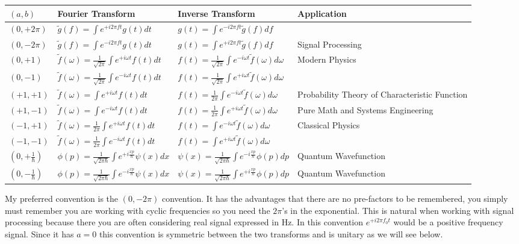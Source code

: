 \documentclass[12pt]{article}
\begin{document}
\begin{center}
\begin{tabularx}{\textwidth}{|m{1.5cm}|m{5cm}|m{5 cm}|X|}
\hline
$(a,b)$ & Fourier Transform & Inverse Transform & Application\\ \hline
$(0,+2\pi)$ & $\tilde{g}(f) = \int e^{+i2\pi f t} g(t) dt$ & $g(t) = \int e^{-i2\pi f t} \tilde{g}(f) df$ & \\ \hline
$(0,-2\pi)$ & $\tilde{g}(f) = \int e^{-i2\pi f t} g(t) dt$ & $g(t) = \int e^{+i2\pi f t} \tilde{g}(f) df$ & Signal Processing\\ \hline
$(0,+1)$ & $\tilde{f}(\omega) = \frac{1}{\sqrt{2\pi}} \int e^{+i\omega t} f(t)dt$ & $f(t) = \frac{1}{\sqrt{2\pi}} \int e^{-i\omega t}\tilde{f}(\omega) d\omega$ & Modern Physics\\ \hline
$(0,-1)$ & $\tilde{f}(\omega) = \frac{1}{\sqrt{2\pi}} \int e^{-i\omega t} f(t)dt$ & $f(t) = \frac{1}{\sqrt{2\pi}} \int e^{+i\omega t}\tilde{f}(\omega) d\omega$ & \\ \hline
$(+1,+1)$ & $\tilde{f}(\omega) = \int e^{+i\omega t} f(t)dt$ & $f(t) = \frac{1}{2\pi} \int e^{-i\omega t}\tilde{f}(\omega) d\omega$ & Probability Theory of Characteristic Function \\ \hline
$(+1,-1)$ & $\tilde{f}(\omega) = \int e^{-i\omega t} f(t)dt$ & $f(t) = \frac{1}{2\pi} \int e^{+i\omega t} \tilde{f}(\omega) d\omega$ & Pure Math and  Systems Engineering\\ \hline
$(-1,+1)$ & $\tilde{f}(\omega) = \frac{1}{2\pi} \int e^{+i\omega t}f(t) dt$ & $f(t) = \int e^{-i\omega t} \tilde{f}(\omega)d\omega$ & Classical Physics\\ \hline
$(-1,-1)$ & $\tilde{f}(\omega) = \frac{1}{2\pi} \int e^{-i\omega t}f(t) dt$ & $f(t) = \int e^{+i\omega t} \tilde{f}(\omega)d\omega$ & \\ \hline
$\left(0, +\frac{1}{\hbar}\right)$ & $\phi(p) = \frac{1}{\sqrt{2\pi \hbar}} \int e^{+i \frac{xp}{\hbar}} \psi(x) dx$ & $\psi(x) = \frac{1}{\sqrt{2\pi \hbar}} \int e^{-i \frac{xp}{\hbar}} \phi(p) dp$ & Quantum Wavefunction\\ \hline
$\left(0, -\frac{1}{\hbar}\right)$ & $\phi(p) = \frac{1}{\sqrt{2\pi \hbar}} \int e^{-i \frac{xp}{\hbar}} \psi(x) dx$ & $\psi(x) = \frac{1}{\sqrt{2\pi \hbar}} \int e^{+i \frac{xp}{\hbar}} \phi(p) dp$ & Quantum Wavefunction\\ \hline
\end{tabularx}
\end{center}

My preferred convention is the $(0,-2\pi)$ convention. It has the advantages that there are no pre-factors to be remembered, you simply must remember you are working with cyclic frequencies so you need the $2\pi$'s in the exponential. This is natural when working with signal processing because there you are often considering real signal expressed in Hz. In this convention $e^{+i2\pi f_0 t}$ would be a positive frequency signal. Since it has $a=0$ this convention is symmetric between the two transforms and is unitary as we will see below.
\end{document}
